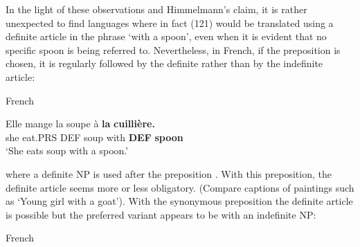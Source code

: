 \z

In the light of these observations and Himmelmann’s claim, it is rather unexpected to find languages where in fact (121) would be translated using a definite article in the phrase ‘with a spoon’, even when it is evident that no specific spoon is being referred to. Nevertheless, in French, if the preposition  is chosen, it is regularly followed by the definite rather than by the indefinite article:


\item 

French



 \ea\label{}
\gll Elle  mange  la  soupe  à  \textbf{la} \textbf{cuillière.}\\


she  eat.PRS  DEF  soup  with  \textbf{DEF} \textbf{spoon}\\

\glt ‘She eats soup with a spoon.’

\z

where a definite NP is used after the preposition . With this preposition, the definite article seems more or less obligatory. (Compare captions of paintings such as  ‘Young girl with a goat’). With the synonymous preposition  the definite article is possible but the preferred variant appears to be with an indefinite NP:


\item 

French



